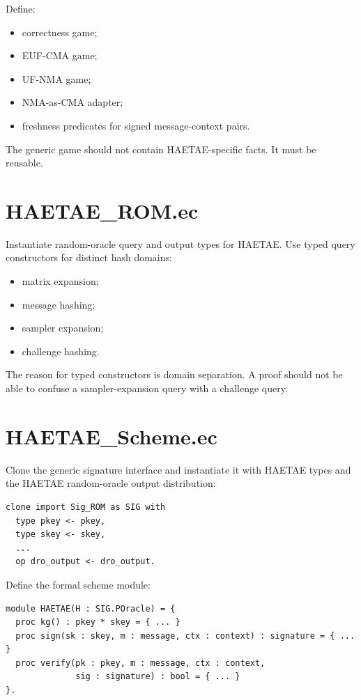 \documentclass[11pt]{report}
\theoremstyle{definition}
\theoremstyle{plain}
\begin{document}
Define:

\begin{itemize}
\item correctness game;
\item EUF-CMA game;
\item UF-NMA game;
\item NMA-as-CMA adapter;
\item freshness predicates for signed message-context pairs.
\end{itemize}

The generic game should not contain HAETAE-specific facts.  It must be reusable.

\section{HAETAE\_ROM.ec}

Instantiate random-oracle query and output types for HAETAE.  Use typed query
constructors for distinct hash domains:

\begin{itemize}
\item matrix expansion;
\item message hashing;
\item sampler expansion;
\item challenge hashing.
\end{itemize}

The reason for typed constructors is domain separation.  A proof should not be
able to confuse a sampler-expansion query with a challenge query.

\section{HAETAE\_Scheme.ec}

Clone the generic signature interface and instantiate it with HAETAE types and
the HAETAE random-oracle output distribution:

\begin{lstlisting}[language=EasyCrypt]
clone import Sig_ROM as SIG with
  type pkey <- pkey,
  type skey <- skey,
  ...
  op dro_output <- dro_output.
\end{lstlisting}

Define the formal scheme module:

\begin{lstlisting}[language=EasyCrypt]
module HAETAE(H : SIG.POracle) = {
  proc kg() : pkey * skey = { ... }
  proc sign(sk : skey, m : message, ctx : context) : signature = { ... }
  proc verify(pk : pkey, m : message, ctx : context,
              sig : signature) : bool = { ... }
}.
\end{lstlisting}
\end{document}

